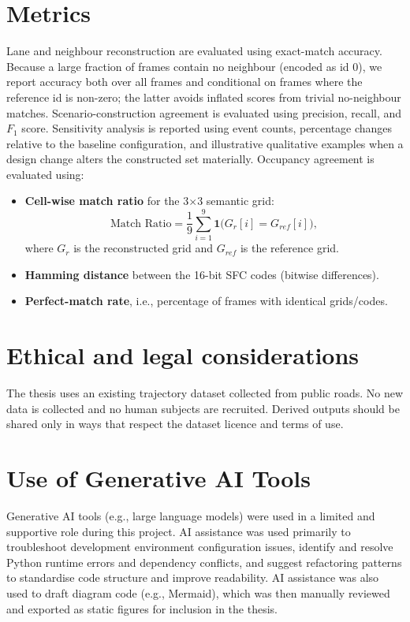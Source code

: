 \documentclass[12pt,a4paper,twoside,openright]{report}
\begin{document}
    \section{Metrics}
    Lane and neighbour reconstruction are evaluated using exact-match accuracy. Because a large fraction of frames contain no neighbour (encoded as id $0$), we report accuracy both over all frames and conditional on frames where the reference id is non-zero; the latter avoids inflated scores from trivial no-neighbour matches. Scenario-construction agreement is evaluated using precision, recall, and $F_1$ score. Sensitivity analysis is reported using event counts, percentage changes relative to the baseline configuration, and illustrative qualitative examples when a design change alters the constructed set materially. Occupancy agreement is evaluated using:

    \begin{itemize}[leftmargin=1.2em]
  \item \textbf{Cell-wise match ratio} for the 3$\times$3 semantic grid:
  \[
      \text{Match Ratio}=\frac{1}{9}\sum_{i=1}^{9}\mathbf{1}\big(G_r[i]=G_{ref}[i]\big),
  \]
  where $G_r$ is the reconstructed grid and $G_{ref}$ is the reference grid.
  \item \textbf{Hamming distance} between the 16-bit SFC codes (bitwise differences).
  \item \textbf{Perfect-match rate}, i.e., percentage of frames with identical grids/codes.
    \end{itemize}

    \section{Ethical and legal considerations}
    The thesis uses an existing trajectory dataset collected from public roads. No new data is collected and no human subjects are recruited. Derived outputs should be shared only in ways that respect the dataset licence and terms of use.

    \section{Use of Generative AI Tools}
    Generative AI tools (e.g., large language models) were used in a limited and supportive role during this project. AI assistance was used primarily to troubleshoot development environment configuration issues, identify and resolve Python runtime errors and dependency conflicts, and suggest refactoring patterns to standardise code structure and improve readability. AI assistance was also used to draft diagram code (e.g., Mermaid), which was then manually reviewed and exported as static figures for inclusion in the thesis.
\end{document}
